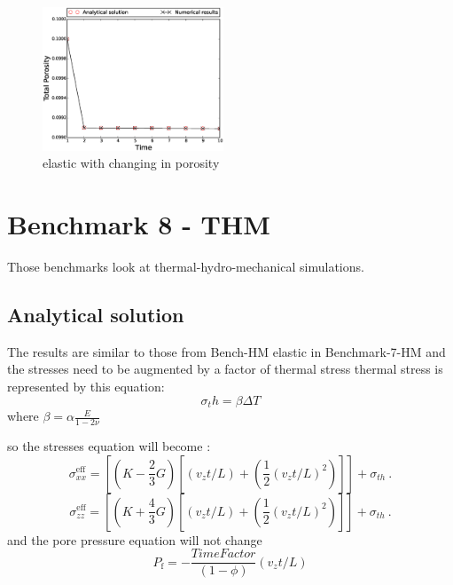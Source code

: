 \documentclass[]{scrreprt}
\begin{document}
\begin{figure}
  \includegraphics[width=0.48\textwidth]{benchmark_7_HM/benchmark_7_HM_bench_HM_elastic_porosity_total_porosity}
  \caption{elastic with changing in porosity}
  
 \end{figure}

\section{Benchmark 8 - THM}
Those benchmarks look at thermal-hydro-mechanical simulations.
\subsection{Analytical solution}
The results are similar to those from Bench-HM elastic in Benchmark-7-HM
 and the stresses need to be augmented by a factor of thermal stress
 thermal stress is represented by this equation:
 \begin{equation}
 \sigma_th=\beta\Delta{T}
 \end{equation}
 where $\beta=\alpha\frac{E}{1-2\nu}$
 
 so the stresses equation will become :
 \begin{equation}
 \label{eq:thermal_stress}
\sigma_{xx}^{\mathrm{eff}} =\left[ (K - \mbox{$\frac{2}{3}$}G)\left[\left( v_{z}t/L\right)+\left(\frac{1}{2}\left( v_{z}t/L\right)^2\right) \right]\right]+\sigma_{th} \ . 
\end{equation}
\begin{equation}
\sigma_{zz}^{\mathrm{eff}} =\left[ (K + \mbox{$\frac{4}{3}$}G)\left[\left( v_{z}t/L\right)+\left(\frac{1}{2}\left( v_{z}t/L\right)^2\right) \right]\right]+\sigma_{th} \ .
\end{equation}
and the pore pressure equation will not change 
\begin{equation}
P_{\mathrm{f}} = -\frac{Time Factor}{(1-\phi)}\left( v_{z}t/L\right)
\end{equation}
 
\end{document}
